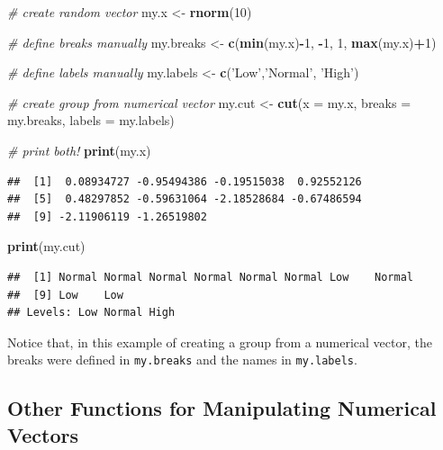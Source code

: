\documentclass[11pt,]{book}
\newenvironment{Shaded}{\begin{snugshade}}{\end{snugshade}}
\newcommand{\KeywordTok}[1]{\textcolor[rgb]{0.27,0.27,0.27}{\textbf{#1}}}
\newcommand{\DataTypeTok}[1]{\textcolor[rgb]{0.27,0.27,0.27}{#1}}
\newcommand{\DecValTok}[1]{\textcolor[rgb]{0.06,0.06,0.06}{#1}}
\newcommand{\StringTok}[1]{\textcolor[rgb]{0.5,0.5,0.5}{#1}}
\newcommand{\CommentTok}[1]{\textcolor[rgb]{0.56,0.35,0.01}{\textit{#1}}}
\newcommand{\OperatorTok}[1]{\textcolor[rgb]{0.81,0.36,0.00}{\textbf{#1}}}
\newcommand{\NormalTok}[1]{#1}
\begin{document}
\begin{Shaded}
\begin{Highlighting}[]
\CommentTok{# create random vector}
\NormalTok{my.x <-}\StringTok{ }\KeywordTok{rnorm}\NormalTok{(}\DecValTok{10}\NormalTok{)}

\CommentTok{# define breaks manually}
\NormalTok{my.breaks <-}\StringTok{ }\KeywordTok{c}\NormalTok{(}\KeywordTok{min}\NormalTok{(my.x)}\OperatorTok{-}\DecValTok{1}\NormalTok{, }\OperatorTok{-}\DecValTok{1}\NormalTok{, }\DecValTok{1}\NormalTok{, }\KeywordTok{max}\NormalTok{(my.x)}\OperatorTok{+}\DecValTok{1}\NormalTok{)}

\CommentTok{# define labels manually}
\NormalTok{my.labels <-}\StringTok{ }\KeywordTok{c}\NormalTok{(}\StringTok{'Low'}\NormalTok{,}\StringTok{'Normal'}\NormalTok{, }\StringTok{'High'}\NormalTok{)}

\CommentTok{# create group from numerical vector}
\NormalTok{my.cut <-}\StringTok{ }\KeywordTok{cut}\NormalTok{(}\DataTypeTok{x =}\NormalTok{ my.x, }\DataTypeTok{breaks =}\NormalTok{ my.breaks, }\DataTypeTok{labels =}\NormalTok{ my.labels)}

\CommentTok{# print both!}
\KeywordTok{print}\NormalTok{(my.x)}
\end{Highlighting}
\end{Shaded}

\begin{verbatim}
##  [1]  0.08934727 -0.95494386 -0.19515038  0.92552126
##  [5]  0.48297852 -0.59631064 -2.18528684 -0.67486594
##  [9] -2.11906119 -1.26519802
\end{verbatim}

\begin{Shaded}
\begin{Highlighting}[]
\KeywordTok{print}\NormalTok{(my.cut)}
\end{Highlighting}
\end{Shaded}

\begin{verbatim}
##  [1] Normal Normal Normal Normal Normal Normal Low    Normal
##  [9] Low    Low   
## Levels: Low Normal High
\end{verbatim}

Notice that, in this example of creating a group from a numerical
vector, the breaks were defined in \texttt{my.breaks} and the names in
\texttt{my.labels}.

\subsection{Other Functions for Manipulating Numerical
Vectors}\label{other-functions-for-manipulating-numerical-vectors}
\end{document}
